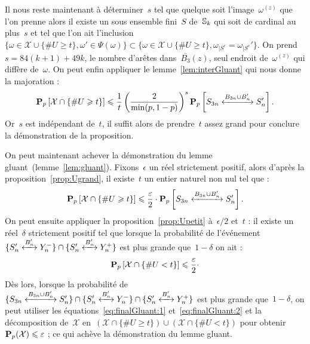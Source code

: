 \begin{dem}
\begin{figure}[h]
\begin{center}
					\end{center}
				\end{figure}								
				Il nous reste maintenant à déterminer~$s$ tel que quelque soit l'image~$\omega^{(z)}$ que l'on prenne alors il existe un sous ensemble fini~$S$ de~$\mathbb{S}_k$ qui soit de cardinal au plus~$s$ et tel que l'on ait l'inclusion~$\{\omega\in\mathcal{X} \cup \{\# U \geq t\} ,\omega'\in\Psi(\omega)\} \subset \{\omega\in\mathcal{X} \cup \{\# U \geq t\} ,\omega_{|S^c}=\omega_{|S^c}'\}$. On prend~$s=84(k+1)+49 k$, le nombre d'arêtes dans~$\overline{B_3}(z)$, seul endroit de~$\omega^{(z)}$ qui diffère de~$\omega$. On peut enfin appliquer le lemme~\ref{lem:interGluant} qui nous donne la majoration :
				\[
					\Pp{\mathcal{X}\cap\{\# U \geq t\}} 
							\leq \frac{1}{t} \left(\frac{2}{\min(p,1-p)}\right)^s
									\Pp{\relie[B_{3n}\cup B_n']{S_{3n}}{S_n'}}.
				\]
				Or~$s$ est indépendant de~$t$, il suffit alors de prendre~$t$ assez grand pour conclure la démonstration de la proposition.
			\end{dem}
			On peut maintenant achever la démonstration du lemme gluant~(lemme~\ref{lem:gluant}). Fixons~$\epsilon$ un réel strictement positif, alors d'après la proposition~\ref{prop:Ugrand}, il existe~$t$ un entier naturel non nul tel que :
			\begin{equation}\label{eq:finalGluant:1}
					\Pp{\mathcal{X}\cap\{\#U \geq t\}} 
				\leq 
					\frac{\epsilon}{2}
					\cdot
					\Pp{\relie[B_{3n}\cup B_n']{S_{3n}}{S_n'}}.			
			\end{equation}
			On peut ensuite appliquer la proposition~\ref{prop:Upetit} à~$\epsilon/2$ et~$t$ : il existe un réel~$\delta$ strictement positif tel que lorsque la probabilité de l'événement~$\{\relie[B_n']{S_n'}{Y_n^-}\}\cap\{\relie[B_n']{S_n'}{Y_n^+}\}$ est plus grande que~$1-\delta$ on ait :
			\begin{equation}\label{eq:finalGluant:2}
				\Pp{\mathcal{X}\cap\{\#U < t\}}
				\leq
				\frac{\epsilon}{2}
				\cdot %
			\end{equation}
			Dès lors, lorsque la probabilité de~$\{\relie[B_{3n}\cup B_n']{S_{3n}}{S_n'}\} \cap \{\relie[B_n']{S_n'}{Y_n^-}\} \cap \{\relie[B_n']{S_n'}{Y_n^+}\}$ est plus grande que~$1-\delta$, on peut utiliser les équations~\eqref{eq:finalGluant:1} et~\eqref{eq:finalGluant:2} et la décomposition de~$\mathcal{X}$ en~$(\mathcal{X}\cap\{\# U \geq t\}) \cup (\mathcal{X}\cap \{\# U < t\})$  pour obtenir~$\bm{\mathrm{P}}_{p}(\mathcal{X}) \leqslant \varepsilon$ ; ce qui achève la démonstration du lemme gluant.

